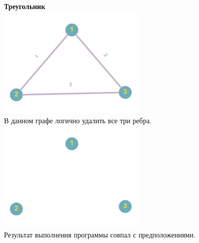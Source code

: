 \documentclass[a4paper,14pt]{extarticle}
\begin{document}
\begin{enumerate}[1.]
        \textbf{Треугольник}\\
        \includegraphics[width=70mm]{testThreeNodesBefore}\\
        В данном графе логично удалить все три ребра.\\
        \includegraphics[width=70mm]{testThreeNodesAfter}\\
        Результат выполнения программы совпал с предположениями.\\


\end{enumerate}
\end{document}
